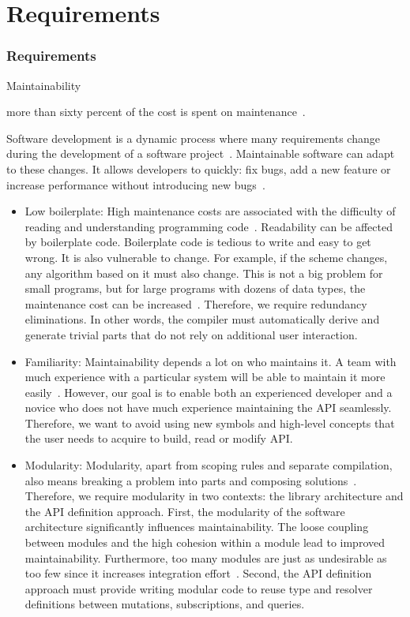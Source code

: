 \section{Requirements}
\begin{frame}\frametitle{Requirements}

\begin{alertblock}{Maintainability}  

more than sixty percent  of the cost is spent on maintenance~\cite{maintainability-metrics,role-of-readability,maintainability-current-trends, readability-props}.

Software development is a dynamic process where many requirements change during the development of a software project~\cite{requirements-change-1,sof-sus-institute-maintainability}.
Maintainable software can adapt to these changes. It allows developers to quickly: fix bugs, add a new feature or increase performance without introducing new bugs~\cite{view-of-web, sof-sus-institute-maintainability}.

\begin{itemize}
    \item Low boilerplate: High maintenance costs are associated with the difficulty of reading and understanding programming code~\cite{role-of-readability,readability-props}. Readability can be affected by boilerplate code. Boilerplate code is tedious to write and easy to get wrong. It is also vulnerable to change. For example, if the scheme changes, any algorithm based on it must also change. This is not a big problem for small programs, but for large programs with dozens of data types, the maintenance cost can be increased~\cite{scrap-your-boilerplate}.
    Therefore, we require redundancy eliminations. In other words, the compiler must automatically derive and generate trivial parts that do not rely on additional user interaction.
    \item Familiarity: Maintainability depends a lot on who maintains it.  A team with much experience with a particular system will be able to maintain it more easily~\cite{contr-reduce-maintainability}. However, our goal is to enable both an experienced developer and a novice who does not have much experience maintaining the API seamlessly. Therefore, we want to avoid using new symbols and high-level concepts that the user needs to acquire to build, read or modify API.
    \item Modularity: Modularity, apart from scoping rules and separate compilation, also means breaking a problem into parts and composing solutions~\cite{history-of-haskell}. Therefore, we require modularity in two contexts: the library architecture and the API definition approach. 
    First, the modularity of the software architecture significantly influences maintainability. The loose coupling between modules and the high cohesion within a module lead to improved maintainability.  Furthermore, too many modules are just as undesirable as too few since it increases integration effort~\cite{arc-modularity}. 
    Second, the API definition approach must provide writing modular code to reuse type and resolver definitions between mutations, subscriptions, and queries. 
    

\end{itemize}
\end{alertblock}
\end{frame}
